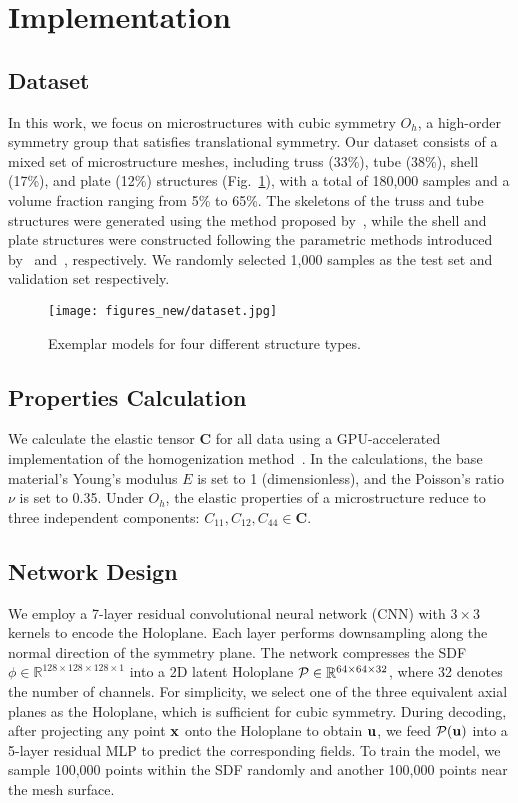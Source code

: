 \section{Implementation}
\label{sec:implementation}
\subsection{Dataset}
\label{sec:dataset}
In this work, we focus on microstructures with cubic symmetry $O_h$, a high-order symmetry group that satisfies translational symmetry. 
Our dataset consists of a mixed set of microstructure meshes, including truss (33\%), tube (38\%), shell (17\%), and plate (12\%) structures (Fig.~\ref{fig:dataset}), with a total of 180,000 samples and a volume fraction ranging from 5\% to 65\%. 
The skeletons of the truss and tube structures were generated using the method proposed by~\cite{panetta2015Elastic}, while the shell and plate structures were constructed following the parametric methods introduced by~\cite{liu2022Parametric} and~\cite{Sun2023}, respectively.
We randomly selected 1,000 samples as the test set and validation set respectively.

\begin{figure}[tb]
    \centering
    \texttt{[image: figures\_new/dataset.jpg]}
    \caption{Exemplar models for four different structure types.}
    \label{fig:dataset}
\end{figure} 

\subsection{Properties Calculation}
\label{sec:properties}
We calculate the elastic tensor $\mathbf{C}$ for all data using a GPU-accelerated implementation of the homogenization method~\cite{andreassen2014Design, dong2018149}.
In the calculations, the base material's Young’s modulus $E$ is set to 1 (dimensionless), and the Poisson’s ratio $\nu$ is set to 0.35.
Under $O_h$, the elastic properties of a microstructure reduce to three independent components: $C_{11}, C_{12}, C_{44} \in \mathbf{C}$. 

\subsection{Network Design}
\label{sec:network_imp}
We employ a 7-layer residual convolutional neural network (CNN) with $3\times3$ kernels to encode the Holoplane. 
Each layer performs downsampling along the normal direction of the symmetry plane.
The network compresses the SDF $\phi \in \mathbb{R}^{128\times128\times128\times1}$ into a 2D latent Holoplane $\mathcal{P} \in \mathbb{R}^{64\times64\times32}$, where 32 denotes the number of channels.
For simplicity, we select one of the three equivalent axial planes as the Holoplane, which is sufficient for cubic symmetry.
During decoding, after projecting any point $\mathbf{x}$ onto the Holoplane to obtain $\mathbf{u}$, we feed $\mathcal{P}(\mathbf{u})$ into a 5-layer residual MLP to predict the corresponding fields.
To train the model, we sample 100,000 points within the SDF randomly and another 100,000 points near the mesh surface.

